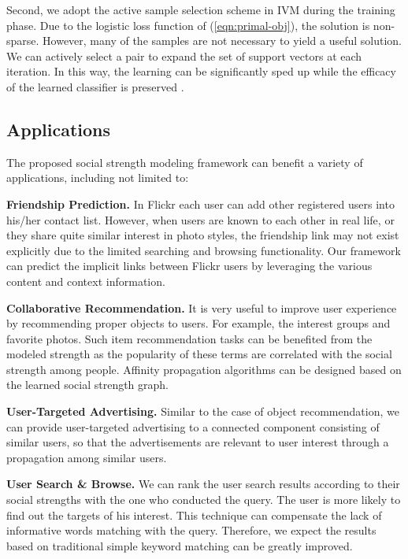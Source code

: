 Second, we adopt the active sample selection scheme in IVM \cite{nips/ZhuH01} during the training phase. Due to the logistic loss function of (\ref{eqn:primal-obj}), the solution is non-sparse. However, many of the samples are not necessary to yield a useful solution. We can actively select a pair to expand the set of support vectors at each iteration. In this way, the learning can be significantly sped up while the efficacy of the learned classifier is preserved \cite{nips/ZhuH01}.

\subsection{Applications}

The proposed social strength modeling framework can benefit a variety of applications, including not limited to:

{\bf Friendship Prediction.} In Flickr each user can add other registered users into his/her contact list. However, when users are known to each other in real
life, or they share quite similar interest in photo styles, the friendship link may not exist explicitly due to the limited searching and browsing
functionality. Our framework can predict the implicit links between Flickr users by leveraging the various content and context information.

{\bf Collaborative Recommendation.} It is very useful to improve user experience by recommending proper objects to users. For example, the interest groups and
favorite photos. Such item recommendation tasks can be benefited from the modeled strength as the popularity of these terms are correlated with the social
strength among people. Affinity propagation algorithms can be designed based on the learned social strength graph.

{\bf User-Targeted Advertising.} Similar to the case of object recommendation, we can provide user-targeted advertising to a connected component consisting of
similar users, so that the advertisements are relevant to user interest through a propagation among similar users.%

{\bf User Search \& Browse.} We can rank the user search results according to their social strengths with the one who conducted the query. The user is more
likely to find out the targets of his interest. This technique can compensate the lack of informative words matching with the query. Therefore, we expect the
results based on traditional simple keyword matching can be greatly improved.

